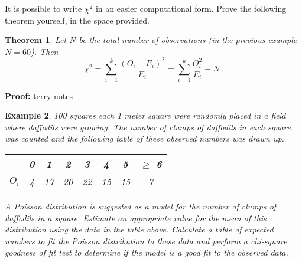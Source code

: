 \documentclass[12pt]{article}
\newtheorem{theorem}{Theorem}[section]
\newtheorem{example}[theorem]{Example}
\begin{document}
It is possible to write $\chi^2$ in an easier computational form. Prove the following theorem yourself, in the space provided.
\begin{theorem}
Let $N$ be the total number of observations {(\rm in the previous example $N=60$)}. Then
$$
\chi^{2}=\sum_{i=1}^{k}\frac{(O_{i}-E_{i})^2}{E_{i}}=\sum_{i=1}^{k}\frac{O_{i}^{2}}{E_{i}}-N \, .
$$
\end{theorem}

\begin{mdframed}
{\bf Proof:}
\textcolor[rgb]{1.00,1.00,1.00}{terry notes\lipsum[1-7]}
\end{mdframed}

\begin{example}
100 squares each 1 meter square were randomly placed in a field where daffodils were growing. The number of clumps of daffodils in each square was counted and the following table of these observed numbers was drawn up.
\begin{center}
\begin{tabular}{|c|c|c|c|c|c|c|c|}
  \hline
   & 0 & 1 & 2 & 3 & 4 & 5 & $\geq$ 6\\ \hline
  $O_{i}$ & 4 & 17 & 20 & 22 & 15 & 15 & 7 \\
  \hline
\end{tabular}
\end{center}
A Poisson distribution is suggested as a model for the number of clumps of daffodils in a square. Estimate an appropriate value for the mean of this distribution using the data in the table above. Calculate a table of expected numbers to fit the Poisson distribution to these data and perform a chi-square goodness of fit test to determine if the model is a good fit to the observed data.
\end{example}
\end{document}
